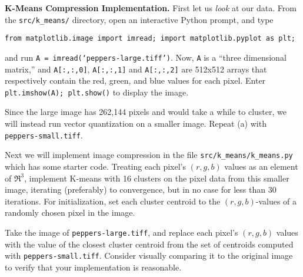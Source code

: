 \item {}
\textbf{K-Means Compression Implementation.}
First let us \emph{look} at our data. From the \texttt{src/k\_means/} directory, open an interactive Python prompt, and type
%
\begin{center}
  \texttt{from matplotlib.image import imread; import matplotlib.pyplot as plt;}
\end{center}
%
and run \texttt{A = imread(`peppers-large.tiff')}. Now, \texttt{A} is a ``three dimensional matrix,'' and \texttt{A[:,:,0]}, \texttt{A[:,:,1]} and \texttt{A[:,:,2]} are 512x512 arrays that respectively contain the red, green, and blue values for each pixel. Enter \texttt{plt.imshow(A); plt.show()} to display the image.

Since the large image has 262,144 pixels and would take a while to cluster, we will instead run vector quantization on a smaller image. Repeat (a) with \texttt{peppers-small.tiff}.


Next we will implement image compression in the file \texttt{src/k\_means/k\_means.py} which has some starter code. Treating each pixel's $(r, g, b)$ values as an element of $\Re^3$, implement K-means with 16 clusters on the pixel data from this smaller image, iterating (preferably) to convergence, but in no case for less than 30 iterations. For initialization, set each cluster centroid to the $(r, g, b)$-values of a randomly chosen pixel in the image.

Take the image of \texttt{peppers-large.tiff}, and replace each pixel's $(r, g, b)$ values with the value of the closest cluster centroid from the set of centroids computed with \texttt{peppers-small.tiff}. Consider visually comparing it to the original image to verify that your implementation is reasonable.
